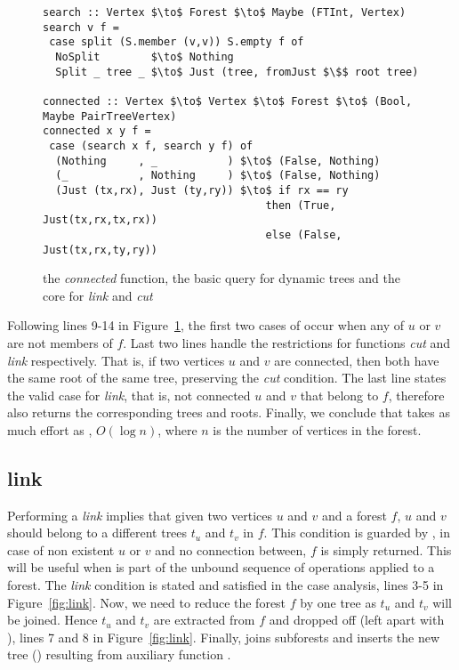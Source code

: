 \begin{figure}
\begin{lstlisting}[mathescape] 
search :: Vertex $\to$ Forest $\to$ Maybe (FTInt, Vertex) 
search v f = 
 case split (S.member (v,v)) S.empty f of 
  NoSplit        $\to$ Nothing 
  Split _ tree _ $\to$ Just (tree, fromJust $\$$ root tree) 

connected :: Vertex $\to$ Vertex $\to$ Forest $\to$ (Bool, Maybe PairTreeVertex) 
connected x y f = 
 case (search x f, search y f) of 
  (Nothing     , _           ) $\to$ (False, Nothing) 
  (_           , Nothing     ) $\to$ (False, Nothing) 
  (Just (tx,rx), Just (ty,ry)) $\to$ if rx == ry 
                                   then (True,  Just(tx,rx,tx,rx))  
                                   else (False, Just(tx,rx,ty,ry))  
\end{lstlisting} 
\caption{the \textit{connected} function, the basic query for dynamic trees and the core for \textit{link} and \textit{cut}}
\label{fig:connected}
\end{figure}
Following lines 9-14 in Figure~\ref{fig:connected}, the first two cases of  occur when any of $u$ or $v$ are not members of $f$. Last two lines handle the restrictions for functions \textit{cut} and \textit{link} respectively. That is, if two vertices $u$ and $v$ are connected, then both have the same root of the same tree, preserving the \textit{cut} condition. The last line states the valid case for \textit{link}, that is, not connected $u$ and $v$ that belong to $f$, therefore  also returns the corresponding trees and roots. Finally, we conclude that  takes as much effort as , $O(\log n)$, where $n$ is the number of vertices in the forest.

\subsection{link}
Performing a \textit{link} implies that given two vertices $u$ and $v$ and a forest $f$, $u$ and $v$ should belong to a different trees $t_u$ and $t_v$ in $f$. This condition is guarded by , in case of non existent $u$ or $v$ and no connection between, $f$ is simply returned. This will be useful when  is part of the unbound sequence of operations applied to a forest. The \textit{link} condition is stated and satisfied in the case analysis, lines 3-5 in Figure~\ref{fig:link}. 
Now, we need to reduce the forest $f$ by one tree as $t_u$ and $t_v$ will be joined. Hence $t_u$ and $t_v$ are extracted from $f$ and dropped off (left apart with \code{_}), lines 7 and 8 in Figure~\ref{fig:link}. Finally,  joins subforests  and inserts the new tree () resulting from auxiliary function .  

